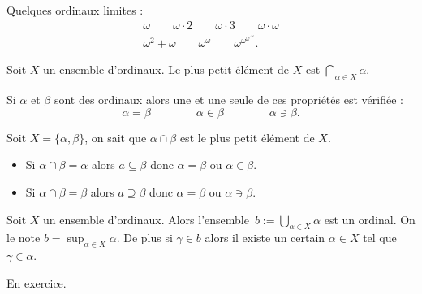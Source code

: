 \documentclass[./main]{subfiles}
\begin{document}
  \begin{exm}
    Quelques ordinaux limites : 
    \begin{gather*}
      \omega\quad\quad\omega \cdot 2\quad\quad\omega \cdot 3 \quad\quad \omega \cdot \omega \\
      \omega^2 + \omega\quad\quad\omega^\omega\quad\quad\omega^{\omega^{\omega^{\iddots^{\omega}}}}.
    \end{gather*}
  \end{exm}

  \begin{lem}
    Soit $X$ un ensemble d'ordinaux.
    Le plus petit élément de $X$ est $\bigcap_{\alpha \in X} \alpha$.
  \end{lem}

  \begin{thm}
    Si $\alpha$ et $\beta$ sont des ordinaux alors une et une seule de ces propriétés est vérifiée :
    \[
      \alpha = \beta
      \quad\quad \quad\quad
      \alpha \in \beta
      \quad\quad \quad\quad
      \alpha \ni \beta
    .\] 
  \end{thm}
  \begin{prv}
    Soit $X = \{\alpha, \beta\}$, on sait que $\alpha \cap \beta$ est le plus petit élément de $X$.
    \begin{itemize}
      \item Si $\alpha \cap \beta = \alpha$ alors $a \subseteq \beta$ donc $\alpha = \beta$ ou $\alpha \in \beta$.
      \item Si $\alpha \cap \beta = \beta$ alors $a \supseteq \beta$ donc $\alpha = \beta$ ou $\alpha \ni \beta$.
    \end{itemize}
  \end{prv}

  \begin{prop}
    Soit $X$ un ensemble d'ordinaux.
    Alors l'ensemble~$b := \bigcup_{\alpha \in X} \alpha$ est un ordinal.
    On le note $b = \sup_{\alpha \in X} \alpha$.
    De plus si $\gamma \in b$ alors il existe un certain $\alpha \in X$ tel que $\gamma \in \alpha$.
  \end{prop}
  \begin{prv}
    En exercice.
  \end{prv}
\end{document}
